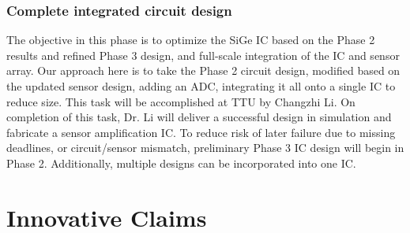 \subsubsection{Complete integrated circuit design}\label{sec:p3:cir}

The objective in this phase is to optimize the SiGe IC based on the Phase 2 results and refined Phase 3 design, and full-scale integration of the IC and sensor array. Our approach here is to take the Phase 2 circuit design, modified based on the updated sensor design, adding an ADC, integrating it all onto a single IC to reduce size. This task will be accomplished at TTU by Changzhi Li. On completion of this task, Dr. Li will deliver a successful design in simulation and fabricate a sensor amplification IC. To reduce risk of later failure due to missing deadlines, or circuit/sensor mismatch, preliminary Phase 3 IC design will begin in Phase 2. Additionally, multiple designs can be incorporated into one IC.

\section{Innovative Claims}\label{sec:inno}

